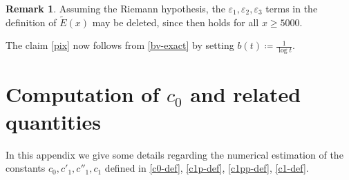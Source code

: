 \documentclass[12pt,a4paper,reqno]{amsart}
\numberwithin{equation}{section}
\theoremstyle{plain}
\theoremstyle{definition}
\newtheorem{remark}[theorem]{Remark}
\newcommand\eps{\varepsilon}
\begin{document}
\begin{remark} Assuming the Riemann hypothesis, the $\eps_1, \eps_2, \eps_3$ terms in the definition of $\tilde E(x)$ may be deleted, since \cite[(7.3)]{buthe} then holds for all $x \geq 5000$.  
\end{remark}

The claim \eqref{pix} now follows from \eqref{bv-exact} by setting $b(t) \coloneqq \frac{1}{\log t}$.  

\section{Computation of \texorpdfstring{$c_0$}{c\_0} and related quantities}\label{c0-app}

In this appendix we give some details regarding the numerical estimation of the constants $c_0, c'_1, c''_1, c_1$ defined in \eqref{c0-def}, \eqref{c1p-def}, \eqref{c1pp-def}, \eqref{c1-def}.  
\end{document}
